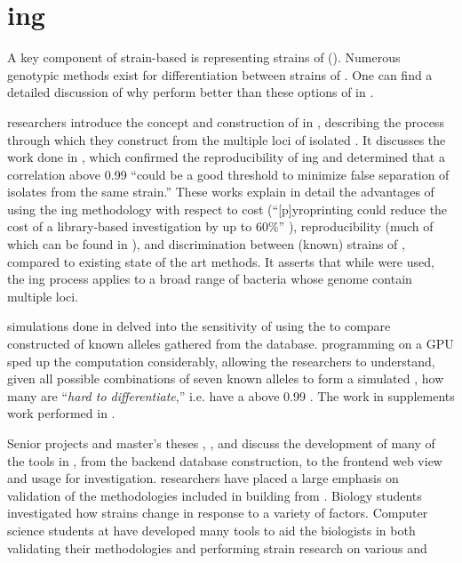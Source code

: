 \section{\Pyro{}ing}
A key component of strain-based \MSTlong{} is representing strains of \fiblong{} (\fib{}).
Numerous genotypic methods exist for differentiation between strains of \ecoli{}. 
One can find a detailed discussion of why \pyros{} perform better than these options of in \cite{kent2014pyroprinting}.

\cp{} researchers introduce the concept and construction of \pyros{} in \cite{Black2014121, kent2014pyroprinting}, describing the process through which they construct \pyros{} from the multiple loci of isolated \ecoli{} \dna{}.
It discusses the work done in \cite{Shealy:SeniorProject}, which confirmed the reproducibility of \pyro{}ing and determined that a \pearson{} correlation above 0.99 ``could be a good threshold to minimize false separation of isolates from the same strain.''
These works explain in detail the advantages of using the \pyro{}ing methodology with respect to cost (``[p]yroprinting could reduce the cost of a library-based \mst{} investigation by up to 60\%'' \cite{Black2014121}), reproducibility (much of which can be found in \cite{Shealy:SeniorProject}), and discrimination between (known) strains of \ecoli{}, compared to existing state of the art methods.
It asserts that while \ecoli{} were used, the \pyro{}ing process applies to a broad range of bacteria whose genome contain multiple loci.

\Silico{} simulations done in \cite{DBLP:conf/bibm/BrandtMSBGK12} delved into the sensitivity of using the \pearson{} to compare constructed \pyros{} of known \ecoli{} alleles gathered from the \ncbilong{} database.
\cuda{} programming on a GPU sped up the \pearson{} computation considerably, allowing the researchers to understand, given all possible combinations of seven known alleles to form a simulated \isol{}, how many \isols{} are ``\textit{hard to differentiate},'' i.e. have a \pearson{} above 0.99 \cite{DBLP:conf/bibm/BrandtMSBGK12}.
The work in \cite{DBLP:conf/bibm/BrandtMSBGK12} supplements \vitro{} work performed in \cite{DBLP:conf/bibm/MontanaDNBK11}.

Senior projects and master's theses \cite{soliman2013cplop}, \cite{ricketts2014cal}, and \cite{webb2011cplop} discuss the development of many of the tools in \cplop{}, from the backend database construction, to the frontend web view and usage for investigation.
\cp{} researchers have placed a large emphasis on validation of the methodologies included in building \pyros{} from \ecoli{}\isols{}.
Biology students investigated how \ecoli{} strains change in response to a variety of factors.
Computer science students at \cp{} have developed many tools to aid the biologists in both validating their methodologies and performing \ecoli{} strain research on various \hosts{} and \spec{}

